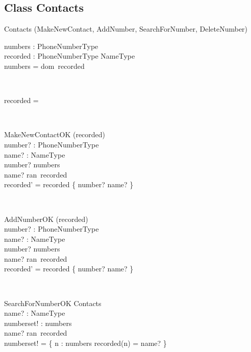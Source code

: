\documentclass[12pt]{article}
\begin{document}
\begin{spacing}{1.5}
\subsection{Class Contacts}
\begin{class}{Contacts}
\also
\upharpoonright (MakeNewContact, AddNumber, SearchForNumber, DeleteNumber) \\
\begin{state}
numbers :  PhoneNumberType\\
recorded : PhoneNumberType \pfun NameType\\
\where
numbers = dom~recorded \\
\end{state} \\
\begin{init}
recorded = \emptyset \\ %
\end{init} \\
\begin{op}{MakeNewContactOK}
\Delta (recorded) \\
number? : PhoneNumberType\\
name? : NameType\\
\ST
number? \notin numbers\\
name? \notin ran~recorded\\
recorded' = recorded \cup \{ number? \mapsto name? \} \\
\end{op}\\
\begin{op}{AddNumberOK}
\Delta (recorded) \\
number? : PhoneNumberType\\
name? : NameType\\
\ST
number? \notin numbers\\
name? \in ran~recorded\\
recorded' = recorded \cup \{ number? \mapsto name? \} \\
\end{op}\\
\begin{op}{SearchForNumberOK}
\Xi Contacts\\
name? : NameType\\
numberset! : \pset numbers\\
\ST
name? \in ran~recorded\\
numberset! = \{ n : numbers \cbar recorded(n) = name? \}
\end{op}\\

\end{class}
\end{spacing}
\end{document}
